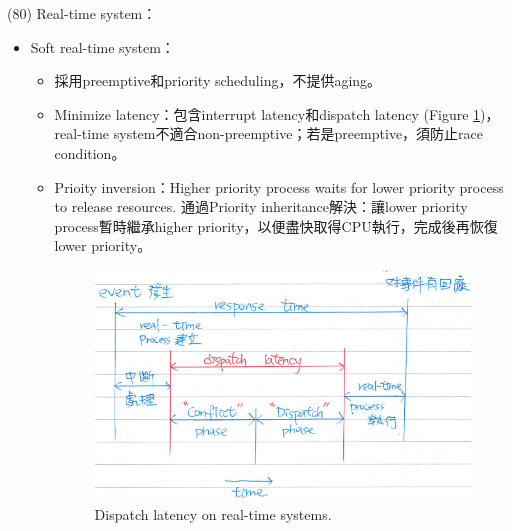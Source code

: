 \begin{theorem}{(80)} Real-time system：\begin{itemize}
        \item Soft real-time system：\begin{itemize}
            \item 採用preemptive和priority scheduling，不提供aging。
            \item Minimize latency：包含interrupt latency和dispatch latency (Figure \ref{img:real_time_dispatch})，real-time system不適合non-preemptive；若是preemptive，須防止race condition。
            \item Prioity inversion：Higher priority process waits for lower priority process to release resources. 通過Priority inheritance解決：讓lower priority process暫時繼承higher priority，以便盡快取得CPU執行，完成後再恢復lower priority。
            \begin{figure}[H]
                \centering
                \includegraphics[scale=0.8]{img/real_time_dispatch.png}
                \caption{Dispatch latency on real-time systems.}
                \label{img:real_time_dispatch}
            \end{figure}
        \end{itemize}
    \end{itemize}
\end{theorem}

